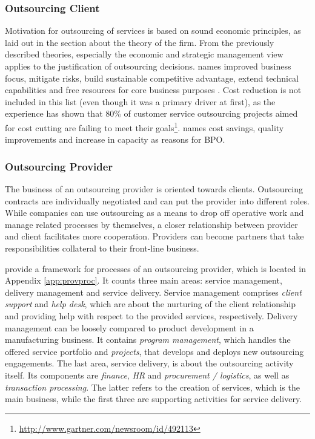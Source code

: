 		\subsubsection{Outsourcing Client}
		Motivation for outsourcing of services is based on sound economic principles, as laid out in the section about the theory of the firm. From the previously described theories, especially the economic and strategic management view applies to the justification of outsourcing decisions. \citeauthor{bartell1998information} names improved business focus, mitigate risks, build sustainable competitive advantage, extend technical capabilities and free resources for core business purposes \citep{bartell1998information}. Cost reduction is not included in this list (even though it was a primary driver at first), as the experience has shown that 80\% of customer service outsourcing projects aimed for cost cutting are failing to meet their goals\footnote{\cf \url{http://www.gartner.com/newsroom/id/492113}}. \citeauthor{gross2006} names cost savings, quality improvements and increase in capacity \citep[]{gross2006} as reasons for \acrshort{BPO}. 
	
		\subsubsection{Outsourcing Provider}
		
		The business of an outsourcing provider is oriented towards clients. Outsourcing contracts are individually negotiated and can put the provider into different roles. While companies can use outsourcing as a means to drop off operative work and manage related processes by themselves, a closer relationship between provider and client facilitates more cooperation. Providers can become partners that take responsibilities collateral to their front-line business. 
		
		\cite{schewe2007} provide a framework for processes of an outsourcing provider, which is located in Appendix \ref{app:provproc}. It counts three main areas: service management, delivery management and service delivery. Service management comprises \textit{client support} and \textit{help desk}, which are about the nurturing of the client relationship and providing help with respect to the provided services, respectively. Delivery management can be loosely compared to product development in a manufacturing business. It contains \textit{program management}, which handles the offered service portfolio and \textit{projects}, that develops and deploys new outsourcing engagements. The last area, service delivery, is about the outsourcing activity itself. Its components are \textit{finance}, \textit{HR} and \textit{procurement / logistics}, as well as \textit{transaction processing}. The latter refers to the creation of services, which is the main business, while the first three are supporting activities for service delivery. 
			
